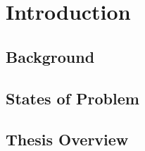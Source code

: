 
\chapter{Introduction}
\label{chap:intro}
\section{Background}

\section{States of Problem}

\section{Thesis Overview}



